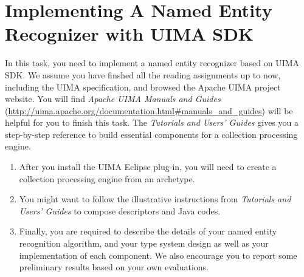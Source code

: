 
\chapter{Implementing A Named Entity Recognizer with UIMA SDK}

In this task, you need to implement a named entity recognizer based on UIMA SDK.
We assume you have finshed all the reading assignments up to now, including the
UIMA specification, and browsed the Apache UIMA project website. You will find
\emph{Apache UIMA Manuals and Guides}
(\url{http://uima.apache.org/documentation.html#manuals_and_guides}) will be
helpful for you to finish this task. The \emph{Tutorials and Users' Guides}
gives you a step-by-step reference to build essential components for a
collection processing engine.

\begin{enumerate}

\item After you install the UIMA Eclipse plug-in, you will need to create a
collection processing engine from an archetype.

\item You might want to follow the illustrative instructions from
\emph{Tutorials and Users' Guides} to compose descriptors and Java codes.

\item Finally, you are required to describe the details of your named entity
recognition algorithm, and your type system design as well as your
implementation of each component. We also encourage you to report some
preliminary results based on your own evaluations.

\end{enumerate}








